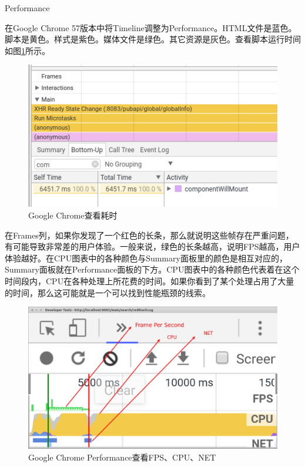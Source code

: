 \documentclass[12pt]{book}
\makeatletter
\numberwithin{dummy}{section}
\theoremstyle{ocrenumbox}
\theoremstyle{blacknumex}
\theoremstyle{blacknumbox}
\theoremstyle{ocrenum}
\renewcommand{\subsection}{\@startsection {subsection}{2}{\z@}
	{-3ex \@plus -0.1ex \@minus -.4ex}
	{0.5ex \@plus.2ex }
	{\normalfont\sffamily\bfseries}}
\makeatother
\begin{document}
\subsection{Performance}

在Google Chrome 57版本中将Timeline调整为Performance。HTML文件是蓝色。脚本是黄色。样式是紫色。媒体文件是绿色。其它资源是灰色。查看脚本运行时间如图\ref{fig:componentwillmountcheck}所示。

\begin{figure}[htbp]
	\centering
	\includegraphics[scale=0.5]{componentwillmountcheck.png}
	\caption{Google Chrome查看耗时}
	\label{fig:componentwillmountcheck}
\end{figure}

在Frames列，如果你发现了一个红色的长条，那么就说明这些帧存在严重问题，有可能导致非常差的用户体验。一般来说，绿色的长条越高，说明FPS越高，用户体验越好。在CPU图表中的各种颜色与Summary面板里的颜色是相互对应的，Summary面板就在Performance面板的下方。CPU图表中的各种颜色代表着在这个时间段内，CPU在各种处理上所花费的时间。如果你看到了某个处理占用了大量的时间，那么这可能就是一个可以找到性能瓶颈的线索。

\begin{figure}[htbp]
	\centering
	\includegraphics[scale=0.3]{chromeperformancegraph.png}
	\caption{Google Chrome Performance查看FPS、CPU、NET}
	\label{fig:chromeperformancegraph}
\end{figure}
\end{document}
